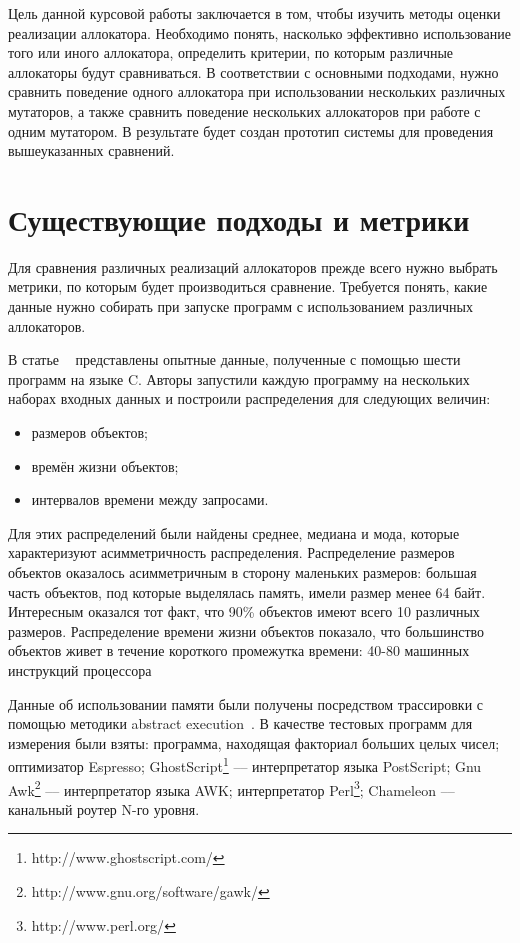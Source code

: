 \documentclass[12pt,a4paper]{article}
\begin{document}
   Цель данной курсовой работы заключается в том, чтобы изучить методы оценки реализации аллокатора. Необходимо понять, насколько 
   эффективно использование того или иного аллокатора, определить критерии, по которым различные аллокаторы будут сравниваться. В 
   соответствии с основными подходами, нужно сравнить поведение одного аллокатора при использовании нескольких различных мутаторов, а также
   сравнить поведение нескольких аллокаторов при работе с одним мутатором. В результате будет создан прототип системы для проведения 
   вышеуказанных сравнений.
   
   \newpage
   \section{Существующие подходы и метрики}
   Для сравнения различных реализаций аллокаторов прежде всего нужно выбрать метрики, по которым будет 
   производиться сравнение. Требуется понять, какие данные нужно собирать при запуске программ
   с использованием различных аллокаторов.
   
   В статье ~\cite{six_progs} представлены опытные данные, полученные с помощью шести программ на языке
   C. Авторы запустили каждую программу на нескольких наборах входных данных и построили распределения для следующих величин:
   
   \begin{itemize}
   \item размеров объектов;
   \item времён жизни объектов;
   \item интервалов времени между запросами.
   \end{itemize}
   
   Для этих распределений были найдены среднее, медиана и мода, которые характеризуют асимметричность распределения. Распределение размеров 
   объектов оказалось асимметричным 
   в сторону маленьких размеров: большая часть объектов, под которые выделялась память, имели размер менее 64 байт. Интересным
   оказался тот факт, что 90\% объектов имеют всего 10 различных размеров. Распределение времени жизни
   объектов показало, что большинство объектов живет в течение короткого промежутка времени: 40-80 машинных инструкций процессора 
   
   Данные об использовании памяти были получены посредством трассировки с помощью методики abstract execution~\cite{ae}. В качестве 
   тестовых программ для измерения были взяты: программа, находящая факториал больших целых чисел; оптимизатор Espresso; 
   GhostScript\footnote{http://www.ghostscript.com/} –-- интерпретатор языка PostScript; Gnu Awk\footnote{http://www.gnu.org/software/gawk/} –-- 
   интерпретатор языка AWK; интерпретатор Perl\footnote{http://www.perl.org/}; Chameleon –-- канальный роутер N-го уровня.
   
\end{document}
